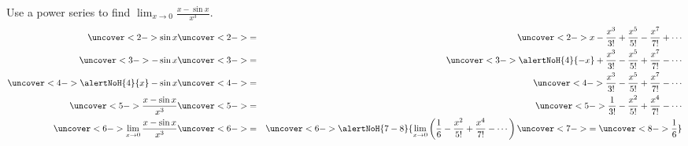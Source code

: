 \begin{frame}
\begin{example}
Use a power series to find $\displaystyle \lim_{x\to 0}\frac{x - \sin x}{x^3}$.
\abovedisplayskip=0pt
\belowdisplayskip=0pt
\begin{eqnarray*}
\uncover<2->{%
\sin x%
}%
& \uncover<2->{=} &%
\uncover<2->{%
 x - \frac{x^3}{3!} + \frac{x^5}{5!} - \frac{x^7}{7!} + \cdots %
}\\%
\uncover<3->{%
- \sin x%
}%
& \uncover<3->{=} &%
\uncover<3->{%
\alertNoH{ 4}{- x} + \frac{x^3}{3!} - \frac{x^5}{5!} + \frac{x^7}{7!} - \cdots %
}\\%
\uncover<4->{%
\alertNoH{ 4}{x} - \sin x%
}%
& \uncover<4->{=} &%
\uncover<4->{%
\frac{x^3}{3!} - \frac{x^5}{5!} + \frac{x^7}{7!} - \cdots %
}\\%
\uncover<5->{%
\frac{x  - \sin x}{x^3}%
}%
& \uncover<5->{=} &%
\uncover<5->{%
\frac{1}{3!} - \frac{x^2}{5!} + \frac{x^4}{7!} - \cdots %
}\\%
\uncover<6->{%
\lim_{x\to 0}\frac{x  - \sin x}{x^3}%
}%
& \uncover<6->{=} &%
\uncover<6->{%
\alertNoH{ 7-8}{%
\lim_{x\to 0}\left( \frac{1}{6} - \frac{x^2}{5!} + \frac{x^4}{7!} - \cdots \right) \uncover<7->{= \uncover<8->{\frac{1}{6}}} %
}%
}%
\end{eqnarray*}
\end{example}
\end{frame}
